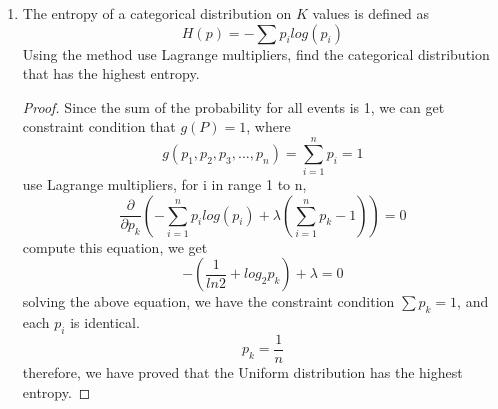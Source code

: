 \documentclass[]{book}
\theoremstyle{definition}
\begin{document}
\begin{enumerate}
\begin{enumerate}
\begin{proof}
	\end{proof}
\end{enumerate} 
\item The entropy of a categorical distribution on $K$ values is defined as 
$$H(p)=-\sum p_i log(p_i)$$
Using the method use Lagrange multipliers, find the categorical distribution that has the highest entropy.
\begin{proof}
	Since the sum of the probability for all events is 1, we can get constraint condition that $g(P)=1$, where
	$$g(p_1,p_2, p_3,...,p_n)=\sum_{i=1}^{n} p_i = 1 $$
	use Lagrange multipliers, for i in range 1 to n,
	$$\frac{\partial}{\partial p_k}(-\sum_{i=1}^{n}p_i log(p_i) + \lambda(\sum_{i=1}^{n}p_k -1))=0$$
	compute this equation, we get 
	$$-(\frac{1}{ln 2 }+ log_2 p_k)+ \lambda = 0$$
	solving the above equation, we have the constraint condition $\sum p_k =1$, and each $p_i$ is identical. 
	$$ p_k = \frac{1}{n}$$
	therefore, we have proved that the Uniform distribution has the highest entropy.
\end{proof}
\end{enumerate}

\end{document}
